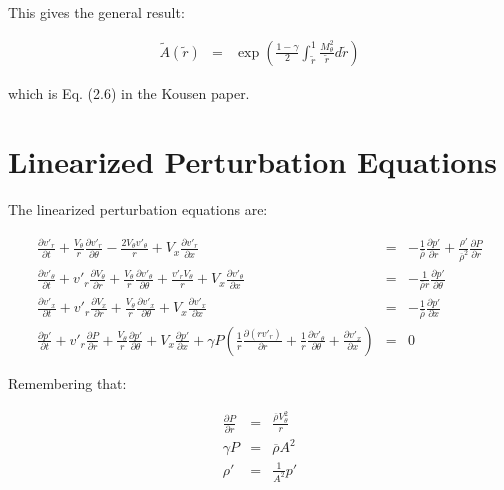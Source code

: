 \documentclass[12pt]{article}
\begin{document}
This gives the general result:

\begin{eqnarray}
\widetilde{A} \left(\widetilde{r} \right)
&=&
\exp{
\left(
\frac{1 - \gamma}{2}
\int_{\widetilde{r}}^{1}
\frac{M_{\theta}^2}{\widetilde{r}}
d \widetilde{r}
\right)
}
\nonumber
\end{eqnarray}

which is Eq. (2.6) in the Kousen paper.

\section{Linearized Perturbation Equations}

The linearized perturbation equations are:

\begin{eqnarray}
\frac{\partial v'_r}{\partial t} 
+ \frac{V_{\theta}}{r}
\frac{\partial v'_r}{\partial \theta}
-\frac{2 V_{\theta} v'_{\theta}}{r}
+V_x \frac{\partial v'_r}{\partial x}
&=&
-\frac{1}{\overline{\rho}} \frac{\partial p'}{\partial r}
+\frac{\rho'}{\overline{\rho}^2} \frac{\partial P}{\partial r}
\nonumber
\\
\frac{\partial v'_{\theta}}{\partial t} 
+v'_r \frac{\partial V_{\theta}}{\partial r}
+ \frac{V_{\theta}}{r}
\frac{\partial v'_{\theta}}{\partial \theta}
+\frac{v'_r V_{\theta}}{r}
+V_x \frac{\partial v'_{\theta}}{\partial x}
&=&
-\frac{1}{\overline{\rho} r} \frac{\partial p'}{\partial \theta}
\nonumber
\\
\frac{\partial v'_x}{\partial t} 
+v'_r \frac{\partial V_x}{\partial r}
+ \frac{V_{\theta}}{r}
\frac{\partial v'_x}{\partial \theta}
+V_x \frac{\partial v'_x}{\partial x}
&=&
-\frac{1}{\overline{\rho}} \frac{\partial p'}{\partial x}
\nonumber
\\
\frac{\partial p'}{\partial t} 
+ v'_r \frac{\partial P}{\partial r}
+ \frac{V_{\theta}}{r} \frac{\partial p'}{\partial \theta}
+ V_x \frac{\partial p'}{\partial x}
+ \gamma P
\left(
\frac{1}{r} \frac{\partial \left(r v'_r \right)}{\partial r}
+\frac{1}{r} \frac{\partial v'_{\theta} }{\partial \theta}
+ \frac{\partial v'_x }{\partial x}
\right)
&=&
0
\nonumber
\end{eqnarray}

Remembering that:

\begin{eqnarray}
\frac{\partial P}{\partial r} &=&
\frac{\overline{\rho} V_{\theta}^2}{r}
\nonumber
\\
\gamma P &=& \overline{\rho} A^2
\nonumber
\\
\rho' &=& \frac{1}{A^2} p'
\nonumber
\end{eqnarray}
\end{document}
